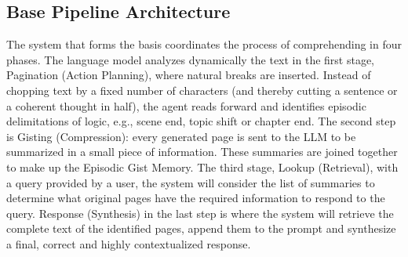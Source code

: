 \documentclass[conference]{IEEEtran}
\begin{document}
\subsection{Base Pipeline Architecture}
The system that forms the basis coordinates the process of comprehending in four phases. The language model analyzes dynamically the text in the first stage, Pagination (Action Planning), where natural breaks are inserted. Instead of chopping text by a fixed number of characters (and thereby cutting a sentence or a coherent thought in half), the agent reads forward and identifies episodic delimitations of logic, e.g., scene end, topic shift or chapter end. The second step is Gisting (Compression): every generated page is sent to the LLM to be summarized in a small piece of information. These summaries are joined together to make up the Episodic Gist Memory. The third stage, Lookup (Retrieval), with a query provided by a user, the system will consider the list of summaries to determine what original pages have the required information to respond to the query. Response (Synthesis) in the last step is where the system will retrieve the complete text of the identified pages, append them to the prompt and synthesize a final, correct and highly contextualized response.
\end{document}
